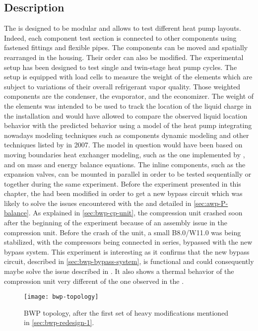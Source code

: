 \subsection{Description}
\label{sec:bwp-description}

The \BWP{} is designed to be modular and allows to test different heat
pump layouts. Indeed, each component test section is connected to
other components using fastened fittings and flexible pipes. The
components can be moved and spatially rearranged in the housing. Their
order can also be modified. The experimental setup has been designed to
test single and twin-stage heat pump cycles. The setup is equipped
with load cells to measure the weight of the elements which are
subject to variations of their overall refrigerant vapor
quality. Those weighted components are the condenser, the evaporator,
and the economizer. The weight of the elements was intended to be used
to track the location of the liquid charge in the installation and
would have allowed to compare the observed liquid location behavior
with the predicted behavior using a model of the heat pump integrating
nowadays modeling techniques such as components dynamic modeling and
other techniques listed by \citet{Ding-2007a} in 2007. The model in
question would have been based on moving boundaries heat exchanger
modeling, such as the one implemented by \citet{Bell-Lemort-2015a},
and on mass and energy balance equations. The inline components, such
as the expansion valves, can be mounted in parallel in order to be
tested sequentially or together during the same experiment. Before the
experiment presented in this chapter, the \BWP{} had been modified in
order to get a new bypass circuit which was likely to solve the issues
encountered with the \AWP{} and detailed in
\cref{sec:awp-P-balance}. As explained in \cref{sec:bwp-cp-unit}, the
compression unit crashed soon after the beginning of the experiment
because of an assembly issue in the compression unit. Before the crash
of the unit, a small B8.0/W11.0 \OP{} was being stabilized, with the
compressors being connected in series, bypassed with the new bypass
system. This experiment is interesting as it confirms that the new
bypass circuit, described in \cref{sec:bwp-bypass-system}, is
functional and could consequently maybe solve the issue described in
. It also shows a thermal behavior of the
compression unit very different of the one observed in the \AWP{}.

\begin{figure}
  \centering
  \texttt{[image: bwp-topology]}
  \caption{BWP topology, after the first set of heavy modifications
    mentioned in \cref{sec:bwp-redesign-1}.}
  \label{fig:bwp-topology}
\end{figure}

